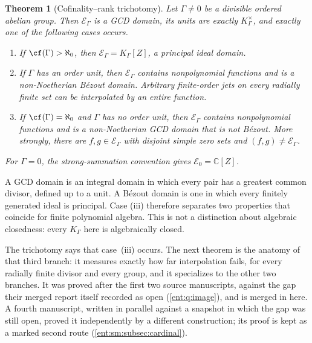 \documentclass[11pt]{article}
\newtheorem{theorem}{Theorem}[section]
\theoremstyle{plain}
\theoremstyle{plain}
\theoremstyle{plain}
\theoremstyle{definition}
\theoremstyle{definition}
\theoremstyle{definition}
\theoremstyle{definition}
\theoremstyle{remark}
\newcommand{\C}{\mathbb C}\newcommand{\R}{\mathbb R}
\newcommand{\K}{K_\Gamma}\newcommand{\KD}{K_\Delta}
\newcommand{\E}{\mathcal E_\Gamma}
\begin{document}
\begin{theorem}[Cofinality--rank trichotomy]\label{ent:thm:main}
Let $\Gamma\ne0$ be a divisible ordered abelian group. Then $\E$ is a GCD
domain, its units are exactly $\K^\times$, and exactly one of the following
cases occurs.
\begin{enumerate}[label=\textnormal{(\roman*)},leftmargin=2em]
\item If $\cf(\Gamma)>\aleph_0$, then $\E=\K[Z]$, a principal ideal domain.
\item If $\Gamma$ has an order unit, then $\E$ contains nonpolynomial
functions and is a non-Noetherian B\'ezout domain. Arbitrary finite-order
jets on every radially finite set can be interpolated by an entire function.
\item If $\cf(\Gamma)=\aleph_0$ and $\Gamma$ has no order unit, then $\E$
contains nonpolynomial functions and is a non-Noetherian GCD domain that is
not B\'ezout. More strongly, there are $f,g\in\E$ with disjoint simple zero
sets and $(f,g)\ne\E$.
\end{enumerate}
For $\Gamma=0$, the strong-summation convention gives $\mathcal E_0=\C[Z]$.
\end{theorem}

A GCD domain is an integral domain in which every pair has a greatest common
divisor, defined up to a unit. A B\'ezout domain is one in which every
finitely generated ideal is principal. Case (iii) therefore separates two
properties that coincide for finite polynomial algebra. This is not a
distinction about algebraic closedness: every $\K$ here is algebraically
closed.

The trichotomy says that case~(iii) occurs. The next theorem is the anatomy
of that third branch: it measures exactly how far interpolation fails, for
every radially finite divisor and every group, and it specializes to the other
two branches. It was proved after the first two source manuscripts, against
the gap their merged report itself recorded as open
(\cref{ent:q:image}), and is merged in here. A fourth manuscript, written in
parallel against a snapshot in which the gap was still open, proved it
independently by a different construction; its proof is kept as a marked
second route (\cref{ent:sm:subsec:cardinal}).
\end{document}
